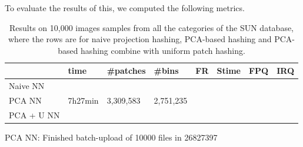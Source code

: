 To evaluate the results of this, we computed the following metrics.


\begin{table}
\begin{tabular}{ | l | l | l | l | l | l | l | l | }
\hline
& time & \#patches & \#bins & FR & Stime & FPQ & IRQ \\
\hline
Naive NN & & & & & & & \\
PCA NN & 7h27min & 3,309,583 & 2,751,235 & & & &  \\
PCA + U NN & & & & & & &\\
\hline
\end{tabular}
\caption{Results on 10,000 images samples from all
the categories of the SUN database, where the rows
are for naive projection hashing, PCA-based hashing and
PCA-based hashing combine with uniform patch hashing.}
\label{tb:nn-res}
\end{table}

PCA NN: Finished batch-upload of 10000 files in 26827397
